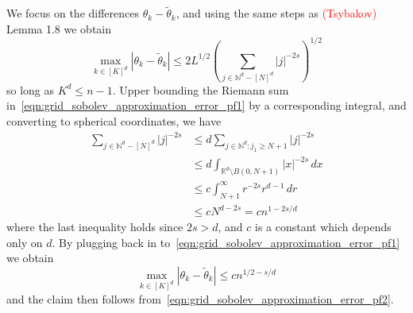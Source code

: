 \documentclass{article}
\newcommand{\Reals}{\mathbb{R}}
\newcommand{\abs}[1]{\left \lvert #1 \right \rvert}
\newcommand{\1}{\mathbf{1}}
\newcommand{\wt}[1]{\widetilde{#1}}
\theoremstyle{alden}
\theoremstyle{aldenthm}
\theoremstyle{definition}
\theoremstyle{remark}
\begin{document}
We focus on the differences $\theta_k - \wt{\theta}_k$, and using the same steps as \textcolor{red}{(Tsybakov)} Lemma 1.8 we obtain
\begin{equation}
\label{eqn:grid_sobolev_approximation_error_pf1}
\max_{k \in [K]^d}\abs{\theta_k - \wt{\theta}_k} \leq 2 L^{1/2} \left(\sum_{j \in \mathbb{N}^d - [N]^d} \abs{j}^{-2s}\right)^{1/2}
\end{equation}
so long as $K^d \leq n - 1$. Upper bounding the Riemann sum in~\eqref{eqn:grid_sobolev_approximation_error_pf1} by a corresponding integral, and converting to spherical coordinates, we have
\begin{align*}
\sum_{j \in \mathbb{N}^d - [N]^d} \abs{j}^{-2s} & \leq d \sum_{j \in \mathbb{N}^d: j_1 \geq N + 1} \abs{j}^{-2s} \\
& \leq d \int_{\Reals^d \setminus B(0,N+1)} \abs{x}^{-2s} \,dx \\
& \leq c \int_{N + 1}^{\infty} r^{-2s} r^{d - 1} \,dr \\
& \leq c N^{d - 2s} = c n^{1 - 2s/d}
\end{align*}
where the last inequality holds since $2s > d$, and $c$ is a constant which depends only on $d$. By plugging back in to~\eqref{eqn:grid_sobolev_approximation_error_pf1} we obtain
\begin{equation*}
\max_{k \in [K]^d}\abs{\theta_k - \wt{\theta}_k} \leq   c n^{1/2 - s/d}
\end{equation*}
and the claim then follows from~\eqref{eqn:grid_sobolev_approximation_error_pf2}.
\end{document}
